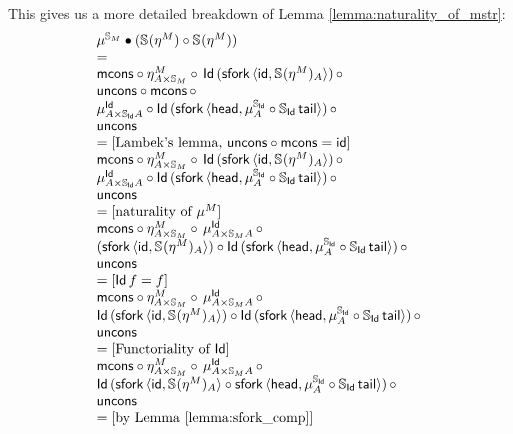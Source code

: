\documentclass{article}
\begin{document}
This gives us a more detailed breakdown of Lemma \ref{lemma:naturality_of_mstr}:
$$
\begin{array}{ll}
	\mu^{\stream{M}} \bullet (\stream{}(\eta^M) \comp \stream{}(\eta^M)) \\
	= \\
	\mcons \circ \eta^M_{A \times \stream{M}} \circ\, \Id\,(\sfork\,\pair{\id}{\stream{}(\eta^M)_A})\, \circ\, \\ 
	 \uncons \circ \mcons\, \circ\, \\
	 \mu^\Id_{A \times \stream{\Id}A} \circ \Id\,(\sfork\,\pair{\head}{\mu^{\stream{\Id}}_A \comp \stream{\Id}\,\tail})\, \circ\, \\
	 \uncons \\
	 = \text{[Lambek's lemma, $\uncons \circ \mcons = \id$]}\\
	\mcons \circ \eta^M_{A \times \stream{M}} \circ\, \Id\,(\sfork\,\pair{\id}{\stream{}(\eta^M)_A})\, \circ\, \\ 
	 \mu^\Id_{A \times \stream{\Id}A} \circ \Id\,(\sfork\,\pair{\head}{\mu^{\stream{\Id}}_A \comp \stream{\Id}\,\tail})\, \circ\, \\
	 \uncons \\
	 = \text{[naturality of $\mu^M$]}\\
	\mcons \circ \eta^M_{A \times \stream{M}} \circ\, \mu^\Id_{A \times \stream{M}A}\, \circ\, \\ 
	 (\sfork\,\pair{\id}{\stream{}(\eta^M)_A}) \circ \Id\,(\sfork\,\pair{\head}{\mu^{\stream{\Id}}_A \comp \stream{\Id}\,\tail})\, \circ\, \\
	 \uncons \\
	 = \text{[$\Id\,f = f$]}\\
	\mcons \circ \eta^M_{A \times \stream{M}} \circ\, \mu^\Id_{A \times \stream{M}A}\, \circ\, \\ 
	 \Id\,(\sfork\,\pair{\id}{\stream{}(\eta^M)_A}) \circ \Id\,(\sfork\,\pair{\head}{\mu^{\stream{\Id}}_A \comp \stream{\Id}\,\tail})\, \circ\, \\
	 \uncons \\
	 = \text{[Functoriality of $\Id$]}\\
	 \mcons \circ \eta^M_{A \times \stream{M}} \circ\, \mu^\Id_{A \times \stream{M}A}\, \circ\, \\ 
	 \Id\,(\sfork\,\pair{\id}{\stream{}(\eta^M)_A} \circ \sfork\,\pair{\head}{\mu^{\stream{\Id}}_A \comp \stream{\Id}\,\tail})\, \circ\, \\
	 \uncons \\
	 = \text{[by Lemma \ref{lemma:sfork_comp}]}\\

\end{array}$$
\end{document}
